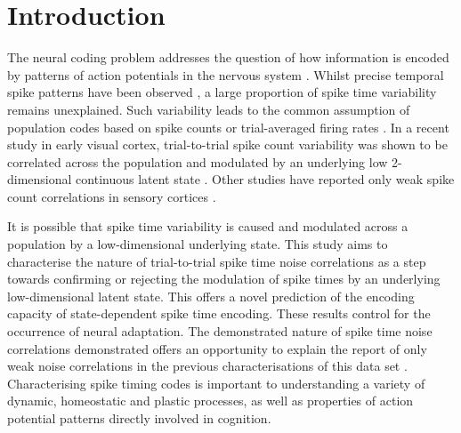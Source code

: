 \documentclass{article}
\begin{document}
\section{Introduction}
The neural coding problem addresses the question of how information is encoded by patterns of action potentials in the nervous system \cite{gerstner1997neural, johnson2000neural, stein2005neuronal, gerstner2014neuronal}. Whilst precise temporal spike patterns have been observed \cite{uzzell2004precision, johansson2004first, gollisch2008rapid, storchi2012comparison, reinagel2002precise, reyes2014laminar}, a large proportion of spike time variability remains unexplained. Such variability leads to the common assumption of population codes based on spike counts \cite{reyes2015high, lin2015nature} or trial-averaged firing rates \cite{hong2016explicit, chang2017code, kar2019evidence, stringer2019high}.
In a recent study in early visual cortex, trial-to-trial spike count variability was shown to be correlated across the population and modulated by an underlying low 2-dimensional continuous latent state \cite{lin2015nature}. Other studies have reported only weak spike count correlations in sensory cortices \cite{reyes2015high}. 

It is possible that spike time variability is caused and modulated across a population by a low-dimensional underlying state. This study aims to characterise the nature of trial-to-trial spike time noise correlations as a step towards confirming or rejecting the modulation of spike times by an underlying low-dimensional latent state. This offers a novel prediction of the encoding capacity of state-dependent spike time encoding. These results control for the occurrence of neural adaptation. The demonstrated nature of spike time noise correlations demonstrated offers an opportunity to  explain the report of only weak noise correlations in the previous characterisations of this data set \cite{reyes2015high}. Characterising spike timing codes is important to understanding a variety of dynamic, homeostatic and plastic processes, as well as properties of action potential patterns directly involved in cognition.

\end{document}
